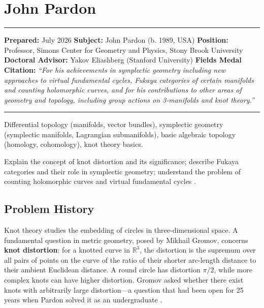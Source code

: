 \chapter{John Pardon}\label{ch2026johnpardon:john-pardon-fields-medal-2026}

\begin{center}\rule{0.5\linewidth}{0.5pt}\end{center}

\textbf{Prepared:} July 2026 \textbf{Subject:} John Pardon (b. 1989, USA) \textbf{Position:} Professor, Simons Center for Geometry and Physics, Stony Brook University \textbf{Doctoral Advisor:} Yakov Eliashberg (Stanford University) \textbf{Fields Medal Citation:} \emph{``For his achievements in symplectic geometry including new approaches to virtual fundamental cycles, Fukaya categories of certain manifolds and counting holomorphic curves, and for his contributions to other areas of geometry and topology, including group actions on 3-manifolds and knot theory.''}

\begin{center}\rule{0.5\linewidth}{0.5pt}\end{center}

\begin{prereqs} Differential topology (manifolds, vector bundles), symplectic geometry (symplectic manifolds, Lagrangian submanifolds), basic algebraic topology (homology, cohomology), knot theory basics. \end{prereqs}

\begin{objectives} Explain the concept of knot distortion and its significance; describe Fukaya categories and their role in symplectic geometry; understand the problem of counting holomorphic curves and virtual fundamental cycles \cite{pardon2016}. \end{objectives}

\section{Problem History}

Knot theory studies the embedding of circles in three-dimensional space. A fundamental question in metric geometry, posed by Mikhail Gromov, concerns \textbf{knot distortion}: for a knotted curve in $\mathbb{R}^3$, the distortion is the supremum over all pairs of points on the curve of the ratio of their shorter arc-length distance to their ambient Euclidean distance. A round circle has distortion $\pi/2$, while more complex knots can have higher distortion. Gromov asked whether there exist knots with arbitrarily large distortion---a question that had been open for 25 years when Pardon solved it as an undergraduate \cite{pardon2011}.

